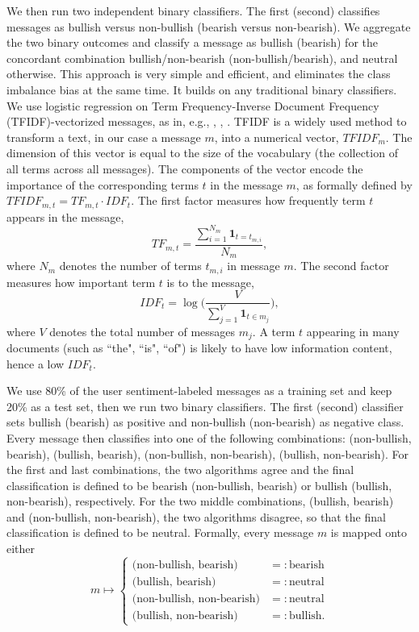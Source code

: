 We then run two independent binary classifiers. The first (second) classifies messages as bullish versus non-bullish (bearish versus non-bearish). We aggregate the two binary outcomes and classify a message as bullish (bearish) for the concordant combination bullish/non-bearish (non-bullish/bearish), and neutral otherwise. This approach is very simple and efficient, and eliminates the class imbalance bias at the same time. It builds on any traditional binary classifiers. We use logistic regression on Term Frequency-Inverse Document Frequency (TFIDF)-vectorized messages, as in, e.g., \citet{nlp1}, \citet{classifq}, \citet{erdemlioglu2017market}. TFIDF is a widely used method to transform a text, in our case a message $m$, into a numerical vector, $TFIDF_m$. The dimension of this vector is equal to the size of the vocabulary (the collection of all terms across all messages). The components of the vector encode the importance of the corresponding terms $t$ in the message $m$, as formally defined by $TFIDF_{m,t} = TF_{m,t} \cdot IDF_t$. The first factor measures how frequently term $t$ appears in the message,
\begin{equation}
TF_{m,t} =\dfrac{\sum_{i=1}^{N_m} \textbf{1}_{t=t_{m,i}}}{N_m},
\end{equation}
where $N_m$ denotes the number of terms $t_{m,i}$ in message $m$. The second factor measures how important term $t$ is to the message,
\begin{equation}
IDF_t = \log \big(\dfrac{V}{\sum_{j=1}^{V} \textbf{1}_{t \in m_j}}\big),
\end{equation}
where $V$ denotes the total number of messages $m_j$. A term $t$ appearing in many documents (such as ``the", ``is", ``of") is likely to have low information content, hence a low $IDF_t$. 

We use 80\% of the user sentiment-labeled messages as a training set and keep 20\% as a test set, then we run two binary classifiers. The first (second) classifier sets bullish (bearish) as positive and non-bullish (non-bearish) as negative class. Every message then classifies into one of the following combinations: (non-bullish, bearish), (bullish, bearish), (non-bullish, non-bearish), (bullish, non-bearish). For the first and last combinations, the two algorithms agree and the final classification is defined to be bearish (non-bullish, bearish) or bullish (bullish, non-bearish), respectively. For the two middle combinations, (bullish, bearish) and (non-bullish, non-bearish), the two algorithms disagree, so that the final classification is defined to be neutral. Formally, every message $m$ is mapped onto either
\begin{equation}
     m\mapsto \begin{cases} \text{(non-bullish, bearish)} & =: \text{bearish} \\ \text{(bullish, bearish)}& =: \text{neutral} \\ \text{(non-bullish, non-bearish)}& =: \text{neutral} \\ \text{(bullish, non-bearish)} &=: \text{bullish.} \end{cases}
\end{equation}

